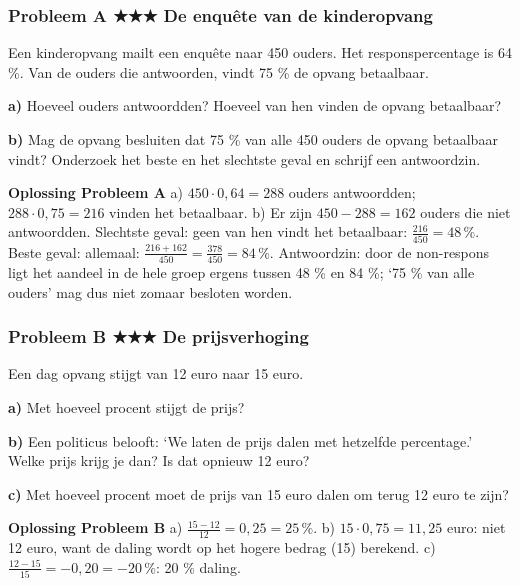 \subsubsection*{Probleem A \quad ★★★ \quad De enquête van de kinderopvang}

Een kinderopvang mailt een enquête naar 450 ouders. Het responspercentage is 64 \%. Van de ouders die antwoorden, vindt 75 \% de opvang betaalbaar.

\textbf{a)} Hoeveel ouders antwoordden? Hoeveel van hen vinden de opvang betaalbaar? \lijn

\textbf{b)} Mag de opvang besluiten dat 75 \% van alle 450 ouders de opvang betaalbaar vindt? Onderzoek het beste en het slechtste geval en schrijf een antwoordzin. \lijn

\begin{oplossing}
\textbf{Oplossing Probleem A} \quad a) $450\cdot 0{,}64=288$ ouders antwoordden; $288\cdot 0{,}75=216$ vinden het betaalbaar. b) Er zijn $450-288=162$ ouders die niet antwoordden. Slechtste geval: geen van hen vindt het betaalbaar: $\frac{216}{450}=48\,\%$. Beste geval: allemaal: $\frac{216+162}{450}=\frac{378}{450}=84\,\%$. Antwoordzin: door de non-respons ligt het aandeel in de hele groep ergens tussen 48 \% en 84 \%; ‘75 \% van alle ouders’ mag dus niet zomaar besloten worden.
\end{oplossing}

\subsubsection*{Probleem B \quad ★★★ \quad De prijsverhoging}

Een dag opvang stijgt van 12 euro naar 15 euro.

\textbf{a)} Met hoeveel procent stijgt de prijs? \lijn

\textbf{b)} Een politicus belooft: ‘We laten de prijs dalen met hetzelfde percentage.’ Welke prijs krijg je dan? Is dat opnieuw 12 euro? \lijn

\textbf{c)} Met hoeveel procent moet de prijs van 15 euro dalen om terug 12 euro te zijn? \lijn

\begin{oplossing}
\textbf{Oplossing Probleem B} \quad a) $\frac{15-12}{12}=0{,}25=25\,\%$. b) $15\cdot 0{,}75=11{,}25$ euro: niet 12 euro, want de daling wordt op het hogere bedrag (15) berekend. c) $\frac{12-15}{15}=-0{,}20=-20\,\%$: 20 \% daling.
\end{oplossing}

